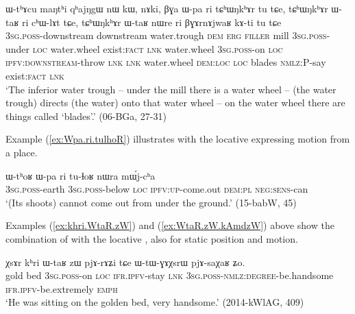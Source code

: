 \begin{exe}
\ex \label{ex:WtaR.ri.Wpa.ri}
\gll ɯ-tʰɤcu maŋtʰi qʰajŋgɯ nɯ kɯ, nɤki, βɣa ɯ-pa ri tɕʰɯŋkʰɤr tu tɕe, tɕʰɯŋkʰɤr ɯ-taʁ ri cʰɯ-lɤt tɕe, tɕʰɯŋkʰɤr ɯ-taʁ nɯre ri βɣɤrnɤjwaʁ kɤ-ti tu tɕe \\
\textsc{3sg}.\textsc{poss}-downstream downstream water.trough \textsc{dem} \textsc{erg} \textsc{filler} mill \textsc{3sg}.\textsc{poss}-under \textsc{loc} water.wheel exist:\textsc{fact} \textsc{lnk} water.wheel \textsc{3sg}.\textsc{poss}-on \textsc{loc} \textsc{ipfv}:\textsc{downstream}-throw \textsc{lnk} \textsc{lnk} water.wheel \textsc{dem}:\textsc{loc} \textsc{loc} blades \textsc{nmlz}:P-say exist:\textsc{fact} \textsc{lnk} \\
\glt `The inferior water trough -- under the mill there is a water wheel -- (the water trough) directs (the water) onto that water wheel -- on the water wheel there are things called `blades'.' (06-BGa, 27-31)
\end{exe}

Example (\ref{ex:Wpa.ri.tulhoR}) illustrates  with the locative  expressing motion from a place.

\begin{exe}
\ex \label{ex:Wpa.ri.tulhoR}
\gll ɯ-tʰoʁ ɯ-pa ri tu-ɬoʁ nɯra mɯ́j-cʰa \\
\textsc{3sg}.\textsc{poss}-earth \textsc{3sg}.\textsc{poss}-below \textsc{loc} \textsc{ipfv}:\textsc{up}-come.out \textsc{dem}:\textsc{pl} \textsc{neg}:\textsc{sens}-can \\
\glt `(Its shoots) cannot come out from under the ground.'  (15-babW, 45)
\end{exe}

Examples (\ref{ex:khri.WtaR.zW}) and (\ref{ex:WtaR.zW.kAmdzW}) above show the combination of  with the locative , also for static position and motion.

\begin{exe}
\ex \label{ex:khri.WtaR.zW}
\gll χsɤr kʰri ɯ-taʁ zɯ pjɤ-rɤʑi tɕe ɯ-tɯ-ɣɤχsrɯ pjɤ-saχaʁ ʑo. \\
gold bed \textsc{3sg}.\textsc{poss}-on \textsc{loc} \textsc{ifr}.\textsc{ipfv}-stay \textsc{lnk} \textsc{3sg}.\textsc{poss}-\textsc{nmlz}:\textsc{degree}-be.handsome \textsc{ifr}.\textsc{ipfv}-be.extremely \textsc{emph} \\
\glt `He was sitting on the golden bed, very handsome.' (2014-kWlAG, 409)
\end{exe}

